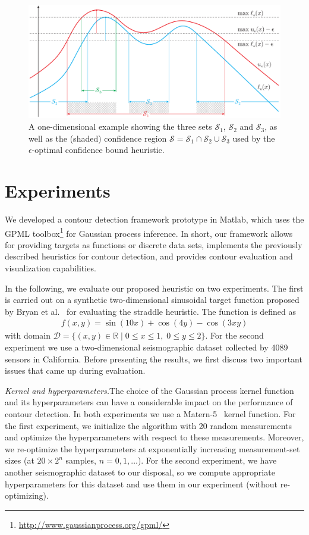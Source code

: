 \documentclass[11pt]{article} %
\begin{document}
\begin{figure}[tb]
  \centering
  \includegraphics[width=\textwidth]{figures/cb_eps}
  \caption{A one-dimensional example showing the three sets $\mathcal{S}_1$,
           $\mathcal{S}_2$ and $\mathcal{S}_3$, as well as
           the (shaded) confidence region
           $\mathcal{S} = \mathcal{S}_1\cap\mathcal{S}_2\cup\mathcal{S}_3$
           used by the $\epsilon$-optimal confidence bound heuristic.}
  \label{fig:cbe}
\end{figure}

\section{Experiments} \label{sect:exp}
We developed a contour detection framework prototype in Matlab, which uses the
GPML toolbox\footnote{\url{http://www.gaussianprocess.org/gpml/}} for
Gaussian process inference. In short, our framework allows for providing
targets as functions or discrete data sets,
implements the previously described heuristics for contour detection, and
provides contour evaluation and visualization capabilities.

In the following, we evaluate our proposed heuristic on two experiments.
The first is carried out on a synthetic two-dimensional sinusoidal target
function proposed by Bryan et al.~\cite{bryan2005} for evaluating the straddle
heuristic. The function is defined as
\begin{align*}
  f(x, y) = \sin(10x) + \cos(4y) - \cos(3xy)
\end{align*}
with domain
$\mathcal{D} = \{(x, y) \in \mathbb{R} \mid 0 \leq x \leq 1,\;0 \leq y \leq 2\}$.
For the second experiment we use a two-dimensional seismographic dataset
collected by 4089 sensors in California.
Before presenting the results, we first discuss two important issues that came up
during evaluation.

\noindent\emph{Kernel and hyperparameters.}\;The choice of the Gaussian process
kernel function and its hyperparameters can have a considerable impact on the
performance of contour detection. In both experiments we use a
Matern-5~\cite{gpbook} kernel function. For the first experiment, we initialize
the algorithm with 20 random measurements and optimize the hyperparameters with
respect to these measurements. Moreover, we re-optimize the hyperparameters at
exponentially increasing measurement-set sizes
(at $20\times 2^n$ samples, $n = 0, 1,\ldots$).
For the second experiment, we have another seismographic dataset
to our disposal, so we compute appropriate hyperparameters for this
dataset and use them in our experiment (without re-optimizing).
\end{document}
